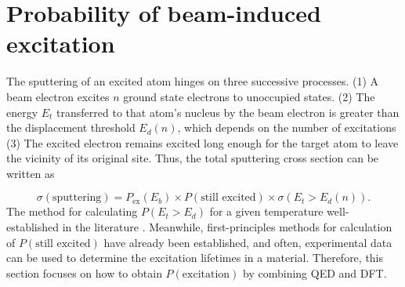 \documentclass{article}
\begin{document}

\section{Probability of beam-induced excitation}
\label{sec:probability}
The sputtering of an excited atom hinges on three successive processes.
(1)
A beam electron excites $n$ ground state electrons to unoccupied states.
(2)
The energy $E_t$ transferred to that atom's nucleus by the beam electron is greater than the displacement threshold $E_d(n)$, which depends on the number of excitations
(3)
The excited electron remains excited long enough for the target atom to leave the vicinity of its original site.
Thus, the total sputtering cross section
can be written as

\begin{equation}
\label{eq:threeProbs}
    \sigma(\text{sputtering})
    =
    P_\text{ex}(E_b)
    \times P(\text{still excited})
    \times \sigma\left(E_t > E_d(n)\right)
    .
\end{equation}
%
The method for calculating $P(E_t > E_d)$ for a given temperature well-established in the literature \cite{Meyer2012,Susi2016,Yoshimura2018}.  Meanwhile, first-principles methods for calculation of $P(\text{still excited})$ have already been established, and often, experimental data can be used to determine the excitation lifetimes in a material.  Therefore, this section focuses on how to obtain $P(\text{excitation})$ by combining QED and DFT.
\end{document}
